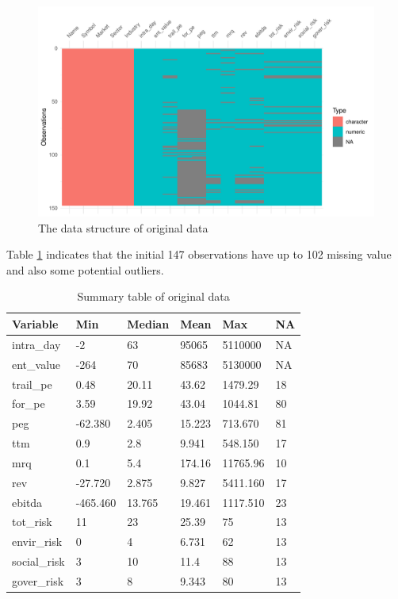 \documentclass[11pt,a4paper,]{article}
\begin{document}
\begin{figure}
\centering
\includegraphics{ass2_files/figure-latex/vis-data-1.pdf}
\caption{\label{fig:vis-data}The data structure of original data}
\end{figure}

Table \ref{tab:summary-table} indicates that the initial 147 observations have up to 102 missing value and also some potential outliers.

\begin{table}

\caption{\label{tab:summary-table}Summary table of original data}
\centering
\begin{tabular}[t]{l|l|l|l|l|l}
\hline
Variable & Min & Median & Mean & Max & NA\\
\hline
intra\_day & -2 & 63 & 95065 & 5110000 & NA\\
\hline
ent\_value & -264 & 70 & 85683 & 5130000 & NA\\
\hline
trail\_pe & 0.48 & 20.11 & 43.62 & 1479.29 & 18\\
\hline
for\_pe & 3.59 & 19.92 & 43.04 & 1044.81 & 80\\
\hline
peg & -62.380 & 2.405 & 15.223 & 713.670 & 81\\
\hline
ttm & 0.9 & 2.8 & 9.941 & 548.150 & 17\\
\hline
mrq & 0.1 & 5.4 & 174.16 & 11765.96 & 10\\
\hline
rev & -27.720 & 2.875 & 9.827 & 5411.160 & 17\\
\hline
ebitda & -465.460 & 13.765 & 19.461 & 1117.510 & 23\\
\hline
tot\_risk & 11 & 23 & 25.39 & 75 & 13\\
\hline
envir\_risk & 0 & 4 & 6.731 & 62 & 13\\
\hline
social\_risk & 3 & 10 & 11.4 & 88 & 13\\
\hline
gover\_risk & 3 & 8 & 9.343 & 80 & 13\\
\hline
\end{tabular}
\end{table}
\end{document}
